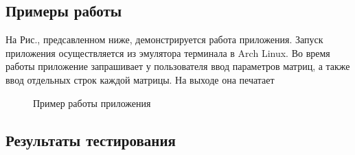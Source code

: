 \documentclass[a4paper,12pt]{article}
\begin{document}
\newpage
\subsection{Примеры работы}
\begin{flushleft}
На Рис., предсавленном ниже, демонстрируется работа приложения. Запуск приложения осуществляется из эмулятора терминала в Arch Linux. Во время работы приложение запрашивает у пользователя ввод параметров матриц, а также ввод отдельных строк каждой матрицы. На выходе она печатает
\end{flushleft}
\begin{figure}[h]
\caption{Пример работы приложения}
\label{images:example}
\end{figure}

\newpage
\subsection{Результаты тестирования}
\end{document}
